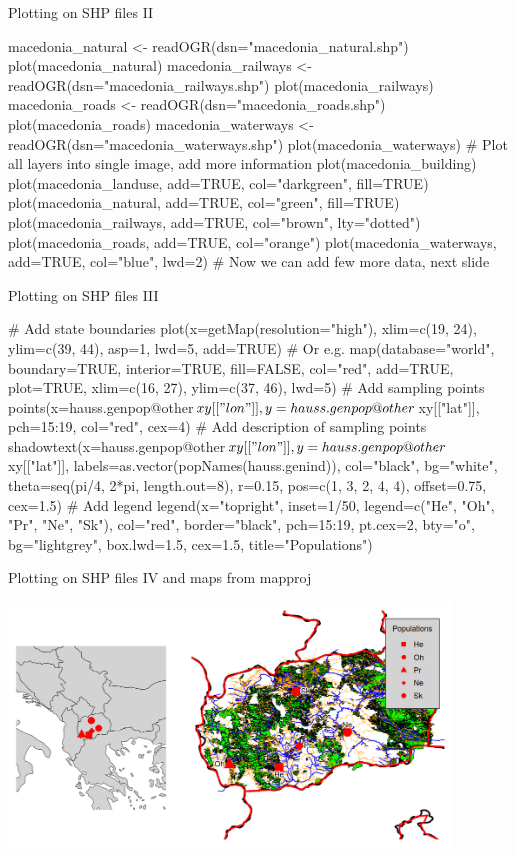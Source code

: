 \documentclass[compress, xelatex, 11pt, xcolor=svgnames, aspectratio=169,
	hyperref={
		bookmarks=true,
		unicode=true,
		colorlinks=true,
		pdftitle={Molecular data in R},
		plainpages=false,
		pdfauthor={Vojtech Zeisek},
		pdfsubject={Course about phylogeny and evolution in R},
		pdfcreator={XeLaTeX},
		pdfkeywords={R, evolution, phylogeny, molecular data},
		linkcolor=Crimson, %
		anchorcolor=Magenta, %
		citecolor=Magenta, %
		filecolor=Magenta, %
		menucolor=Magenta, %
		urlcolor=DodgerBlue, %
		},
	url={hyphens, lowtilde} %
	]{beamer}
\begin{document}
\begin{frame}[fragile]{Plotting on SHP files II}
	\begin{spluscode}
    macedonia_natural <- readOGR(dsn="macedonia_natural.shp")
    plot(macedonia_natural)
    macedonia_railways <- readOGR(dsn="macedonia_railways.shp")
    plot(macedonia_railways)
    macedonia_roads <- readOGR(dsn="macedonia_roads.shp")
    plot(macedonia_roads)
    macedonia_waterways <- readOGR(dsn="macedonia_waterways.shp")
    plot(macedonia_waterways)
    # Plot all layers into single image, add more information
    plot(macedonia_building)
    plot(macedonia_landuse, add=TRUE, col="darkgreen", fill=TRUE)
    plot(macedonia_natural, add=TRUE, col="green", fill=TRUE)
    plot(macedonia_railways, add=TRUE, col="brown", lty="dotted")
    plot(macedonia_roads, add=TRUE, col="orange")
    plot(macedonia_waterways, add=TRUE, col="blue", lwd=2)
    # Now we can add few more data, next slide
	\end{spluscode}
\end{frame}

\begin{frame}[fragile]{Plotting on SHP files III}
	\begin{spluscode}
    # Add state boundaries
    plot(x=getMap(resolution="high"), xlim=c(19, 24), ylim=c(39, 44), asp=1,
      lwd=5, add=TRUE) # Or e.g.
    map(database="world", boundary=TRUE, interior=TRUE, fill=FALSE,
      col="red", add=TRUE, plot=TRUE, xlim=c(16, 27), ylim=c(37, 46), lwd=5)
    # Add sampling points
    points(x=hauss.genpop@other$xy[["lon"]],
      y=hauss.genpop@other$xy[["lat"]], pch=15:19, col="red", cex=4)
    # Add description of sampling points
    shadowtext(x=hauss.genpop@other$xy[["lon"]], y=hauss.genpop@other$
      xy[["lat"]], labels=as.vector(popNames(hauss.genind)), col="black",
      bg="white", theta=seq(pi/4, 2*pi, length.out=8), r=0.15,
      pos=c(1, 3, 2, 4, 4), offset=0.75, cex=1.5)
    # Add legend
    legend(x="topright", inset=1/50, legend=c("He", "Oh", "Pr", "Ne", "Sk"),
      col="red", border="black", pch=15:19, pt.cex=2, bty="o",
      bg="lightgrey", box.lwd=1.5, cex=1.5, title="Populations")
	\end{spluscode}
\end{frame}

\begin{frame}{Plotting on SHP files IV and maps from mapproj}
	\begin{center}
		\includegraphics[height=6.5cm]{mapy.png}
	\end{center}
\end{frame}
\end{document}
